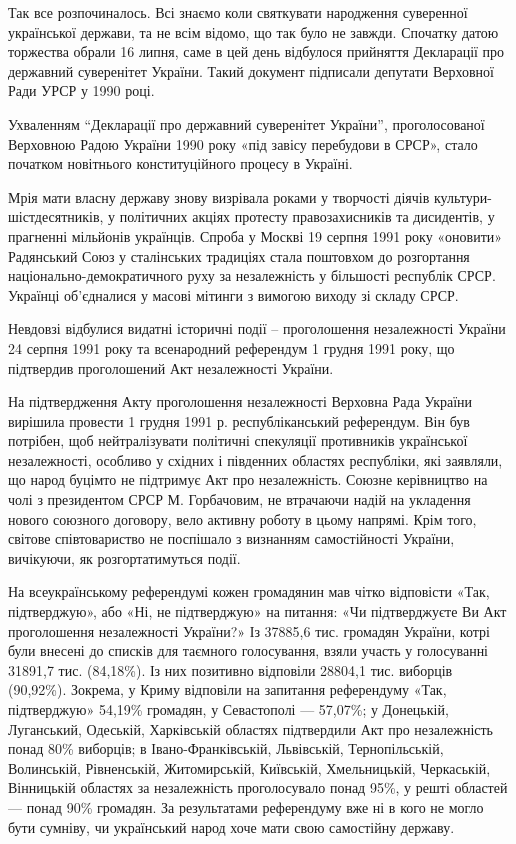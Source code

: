 Так все розпочиналось. Всі знаємо  коли святкувати народження суверенної
української держави, та не всім відомо, що так було не завжди. Спочатку датою
торжества обрали 16 липня, саме в цей день відбулося прийняття Декларації про
державний суверенітет України. Такий документ підписали депутати Верховної
Ради УРСР у 1990 році.

Ухваленням \enquote{Декларації про державний суверенітет України},
проголосованої Верховною Радою України 1990 року «під завісу перебудови в
СРСР», стало початком новітнього конституційного процесу в Україні.

Мрія мати власну державу знову визрівала роками у творчості
діячів культури-шістдесятників, у політичних акціях протесту
правозахисників та дисидентів, у прагненні мільйонів українців.
Спроба у Москві 19 серпня 1991 року «оновити» Радянський Союз у
сталінських традиціях стала поштовхом до розгортання
національно-демократичного руху за незалежність у більшості
республік СРСР. Українці об’єдналися у масові мітинги з вимогою
виходу зі складу СРСР.

Невдовзі відбулися видатні історичні події – проголошення незалежності
України 24 серпня 1991 року та всенародний референдум 1 грудня 1991 року, що
підтвердив проголошений Акт незалежності України.

На підтвердження Акту проголошення незалежності Верховна Рада України вирішила
провести 1 грудня 1991 р. республіканський референдум. Він був потрібен, щоб
нейтралізувати політичні спекуляції противників української незалежності,
особливо у східних і південних областях республіки, які заявляли, що народ
буцімто не підтримує Акт про незалежність. Союзне керівництво на чолі з
президентом СРСР М. Горбачовим, не втрачаючи надій на укладення нового союзного
договору, вело активну роботу в цьому напрямі. Крім того, світове
співтовариство не поспішало з визнанням самостійності України, вичікуючи, як
розгортатимуться події. 

На всеукраїнському референдумі кожен громадянин мав
чітко відповісти «Так, підтверджую», або «Ні, не підтверджую» на питання: «Чи
підтверджуєте Ви Акт проголошення незалежності України?» Із 37885,6 тис.
громадян України, котрі були внесені до списків для таємного голосування, взяли
участь у голосуванні 31891,7 тис. (84,18\%). Із них позитивно відповіли 28804,1
тис. виборців (90,92\%). Зокрема, у Криму відповіли на запитання референдуму
«Так, підтверджую» 54,19\% громадян, у Севастополі — 57,07\%; у Донецькій,
Луганський, Одеській, Харківській областях підтвердили Акт про незалежність
понад 80\% виборців; в Івано-Франківській, Львівській, Тернопільській,
Волинській, Рівненській, Житомирській, Київській, Хмельницькій, Черкаській,
Вінницькій областях за незалежність проголосувало понад 95\%, у решті областей —
понад 90\% громадян. За результатами референдуму вже ні в кого не могло бути
сумніву, чи український народ хоче мати свою самостійну державу. 

